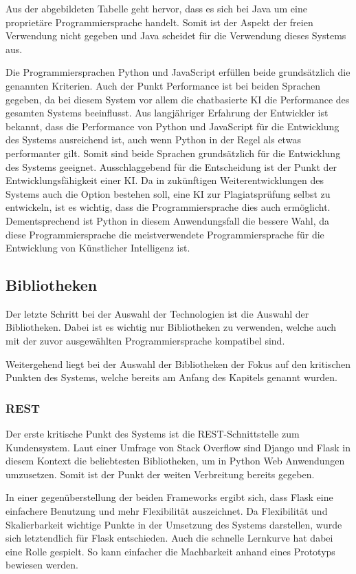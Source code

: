 Aus der abgebildeten Tabelle geht hervor, dass es sich bei Java um eine proprietäre Programmiersprache handelt.
Somit ist der Aspekt der freien Verwendung nicht gegeben und Java scheidet für die Verwendung dieses Systems aus.

Die Programmiersprachen Python und JavaScript erfüllen beide grundsätzlich die genannten Kriterien.
Auch der Punkt Performance ist bei beiden Sprachen gegeben, da bei diesem System
vor allem die chatbasierte KI die Performance des gesamten Systems beeinflusst.
Aus langjähriger Erfahrung der Entwickler ist bekannt, dass die
Performance von Python und JavaScript für die Entwicklung des Systems ausreichend ist,
auch wenn Python in der Regel als etwas performanter gilt.
Somit sind beide Sprachen grundsätzlich für die Entwicklung des Systems geeignet.
Ausschlaggebend für die Entscheidung ist der Punkt der Entwicklungsfähigkeit einer KI.
Da in zukünftigen Weiterentwicklungen des Systems auch die Option bestehen soll, eine KI zur Plagiatsprüfung selbst zu entwickeln,
ist es wichtig, dass die Programmiersprache dies auch ermöglicht.
Dementsprechend ist Python in diesem Anwendungsfall die bessere Wahl, da diese Programmiersprache
die meistverwendete Programmiersprache für die Entwicklung von Künstlicher Intelligenz ist.

\subsection{Bibliotheken}\label{subsec:bibliotheken}
Der letzte Schritt bei der Auswahl der Technologien ist die Auswahl der Bibliotheken.
Dabei ist es wichtig nur Bibliotheken zu verwenden, welche auch mit der zuvor ausgewählten Programmiersprache kompatibel sind.

Weitergehend liegt bei der Auswahl der Bibliotheken der Fokus auf den kritischen
Punkten des Systems, welche bereits am Anfang des Kapitels genannt wurden.

\subsubsection{REST}\label{subsubsec:rest}
Der erste kritische Punkt des Systems ist die REST-Schnittstelle zum Kundensystem.
Laut einer Umfrage von Stack Overflow sind Django und Flask in diesem Kontext die beliebtesten
Bibliotheken, um in Python Web Anwendungen umzusetzen\autocite{webframeworks}.
Somit ist der Punkt der weiten Verbreitung bereits gegeben.

In einer gegenüberstellung der beiden Frameworks ergibt sich, dass Flask eine einfachere
Benutzung und mehr Flexibilität auszeichnet\autocite{flaskdjango}.
Da Flexibilität und Skalierbarkeit wichtige Punkte in der Umsetzung des Systems darstellen,
wurde sich letztendlich für Flask entschieden.
Auch die schnelle Lernkurve hat dabei eine Rolle gespielt.
So kann einfacher die Machbarkeit anhand eines Prototyps bewiesen werden.

